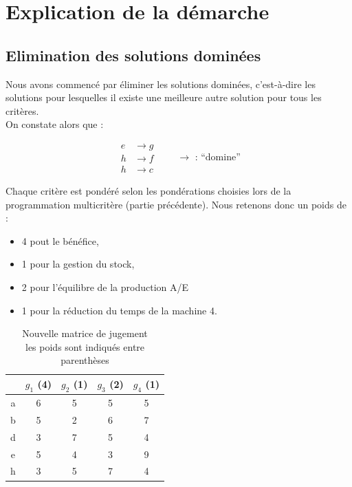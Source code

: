 \documentclass[paper=a4, fontsize=11pt]{report}
\numberwithin{equation}{section}		%
\numberwithin{figure}{section}			%
\numberwithin{table}{section}				%
\begin{document}
\section{Explication de la démarche}

\subsection{Elimination des solutions dominées}

Nous avons commencé par éliminer les solutions dominées, c’est-à-dire les solutions pour lesquelles il existe une meilleure autre solution pour tous les critères.\\

On constate alors que :

\begin{equation*}
  \left.
    \begin{aligned}
	e & \rightarrow g \\
 h & \rightarrow f \\
 h & \rightarrow c 
    \end{aligned}
  \right. \quad \quad \rightarrow \text{ : “domine”}
\end{equation*}

Chaque critère est pondéré selon les pondérations choisies lors de la programmation multicritère (partie précédente). 
Nous retenons donc un poids de :\\

 \begin{itemize}
\item 4 pout le bénéfice,
\item 1 pour la gestion du stock,
\item 2 pour l’équilibre de la production A/E
\item 1 pour la réduction du temps de la machine 4.\\
\end{itemize}


\begin{table}[H]
\begin{center}
\begin{tabular}{c|cccc}
 & $g_1$ (4) & $g_2$ (1) & $g_3$ (2) & $g_4$ (1) \\ 
\hline 
a & 6 & 5 & 5 & 5 \\ 
b & 5 & 2 & 6 & 7 \\ 
d & 3 & 7 & 5 & 4 \\ 
e & 5 & 4 & 3 & 9 \\ 
h & 3 & 5 & 7 & 4 \\ 
\end{tabular} 
\caption{Nouvelle matrice de jugement\\ 
les poids sont indiqués entre parenthèses} 
\end{center}
\end{table}
\end{document}
